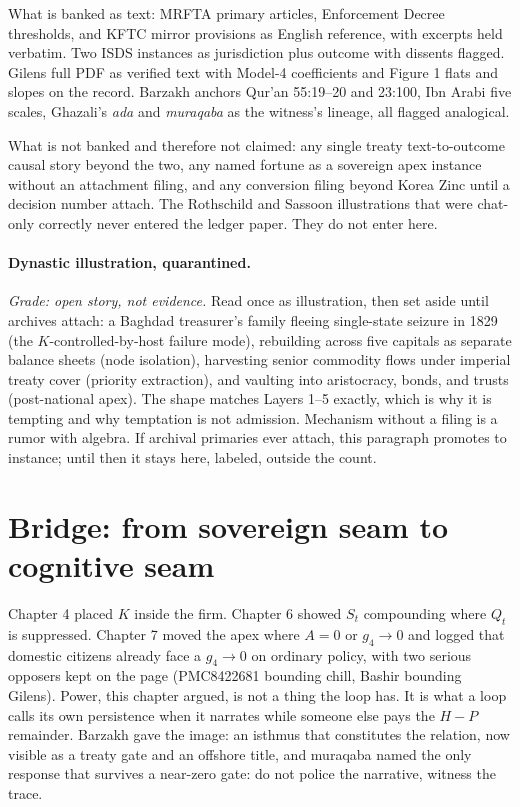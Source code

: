 What is banked as text: MRFTA primary articles, Enforcement Decree thresholds, and KFTC mirror provisions as English reference, with excerpts held verbatim. Two ISDS instances as jurisdiction plus outcome with dissents flagged. Gilens full PDF as verified text with Model-4 coefficients and Figure 1 flats and slopes on the record. Barzakh anchors Qur'an 55:19--20 and 23:100, Ibn Arabi five scales, Ghazali's \textit{ada} and \textit{muraqaba} as the witness's lineage, all flagged analogical.

What is not banked and therefore not claimed: any single treaty text-to-outcome causal story beyond the two, any named fortune as a sovereign apex instance without an attachment filing, and any conversion filing beyond Korea Zinc until a decision number attach. The Rothschild and Sassoon illustrations that were chat-only correctly never entered the ledger paper. They do not enter here.

\paragraph{Dynastic illustration, quarantined.} \textit{Grade: open story, not evidence.} Read once as illustration, then set aside until archives attach: a Baghdad treasurer's family fleeing single-state seizure in 1829 (the $K$-controlled-by-host failure mode), rebuilding across five capitals as separate balance sheets (node isolation), harvesting senior commodity flows under imperial treaty cover (priority extraction), and vaulting into aristocracy, bonds, and trusts (post-national apex). The shape matches Layers 1--5 exactly, which is why it is tempting and why temptation is not admission. Mechanism without a filing is a rumor with algebra. If archival primaries ever attach, this paragraph promotes to instance; until then it stays here, labeled, outside the count.

\section{Bridge: from sovereign seam to cognitive seam}

Chapter 4 placed $K$ inside the firm. Chapter 6 showed $S_t$ compounding where $Q_t$ is suppressed. Chapter 7 moved the apex where $A=0$ or $g_4 \to 0$ and logged that domestic citizens already face a $g_4 \to 0$ on ordinary policy, with two serious opposers kept on the page (PMC8422681 bounding chill, Bashir bounding Gilens). Power, this chapter argued, is not a thing the loop has. It is what a loop calls its own persistence when it narrates while someone else pays the $H - P$ remainder. Barzakh gave the image: an isthmus that constitutes the relation, now visible as a treaty gate and an offshore title, and muraqaba named the only response that survives a near-zero gate: do not police the narrative, witness the trace.

